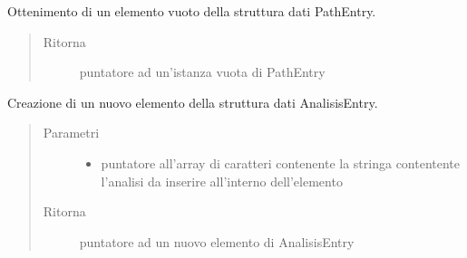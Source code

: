 \documentclass[letterpaper,10pt,italian,openany,oneside]{sphinxmanual}
\begin{document}

\begin{fulllineitems}
\label{\detokenize{code/datastructure:c.emptyPath}}
Ottenimento di un elemento vuoto della struttura dati PathEntry.
\begin{quote}\begin{description}
\item[{Ritorna}] \leavevmode
puntatore ad un’istanza vuota di PathEntry

\end{description}\end{quote}

\end{fulllineitems}


\begin{fulllineitems}
\label{\detokenize{code/datastructure:c.createNewAnalisis}}
Creazione di un nuovo elemento della struttura dati AnalisisEntry.
\begin{quote}\begin{description}
\item[{Parametri}] \leavevmode\begin{itemize}
\item {} 
 \textendash{} puntatore all’array di caratteri contenente la stringa contentente l’analisi da inserire all’interno dell’elemento

\end{itemize}

\item[{Ritorna}] \leavevmode
puntatore ad un nuovo elemento di AnalisisEntry

\end{description}\end{quote}

\end{fulllineitems}

\end{document}
